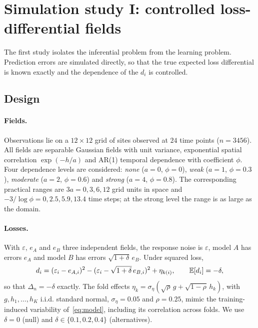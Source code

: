 \section{Simulation study I: controlled loss-differential fields}\label{sec:sim1}

The first study isolates the inferential problem from the learning problem. Prediction errors are simulated directly, so that the true expected loss differential is known exactly and the dependence of the $d_i$ is controlled.

\subsection{Design}

\paragraph{Fields.} Observations lie on a $12\times12$ grid of sites observed at $24$ time points ($n=3456$). All fields are separable Gaussian fields with unit variance, exponential spatial correlation $\exp(-h/a)$ and AR(1) temporal dependence with coefficient $\phi$. Four dependence levels are considered: \emph{none} ($a=0$, $\phi=0$), \emph{weak} ($a=1$, $\phi=0.3$), \emph{moderate} ($a=2$, $\phi=0.6$) and \emph{strong} ($a=4$, $\phi=0.8$). The corresponding practical ranges are $3a=0,3,6,12$ grid units in space and $-3/\log\phi=0,2.5,5.9,13.4$ time steps; at the strong level the range is as large as the domain.

\paragraph{Losses.} With $\varepsilon$, $e_A$ and $e_B$ three independent fields, the response noise is $\varepsilon$, model $A$ has errors $e_A$ and model $B$ has errors $\sqrt{1+\delta}\,e_B$. Under squared loss,
\[
d_i=(\varepsilon_i-e_{A,i})^2-(\varepsilon_i-\sqrt{1+\delta}\,e_{B,i})^2+\eta_{k(i)},\qquad \mathbb{E}[d_i]=-\delta ,
\]
so that $\Delta_n=-\delta$ exactly. The fold effects $\eta_k=\sigma_\eta(\sqrt{\rho}\,g+\sqrt{1-\rho}\,h_k)$, with $g,h_1,\dots,h_K$ i.i.d. standard normal, $\sigma_\eta=0.05$ and $\rho=0.25$, mimic the training-induced variability of~\eqref{eq:model}, including its correlation across folds. We use $\delta=0$ (null) and $\delta\in\{0.1,0.2,0.4\}$ (alternatives).

